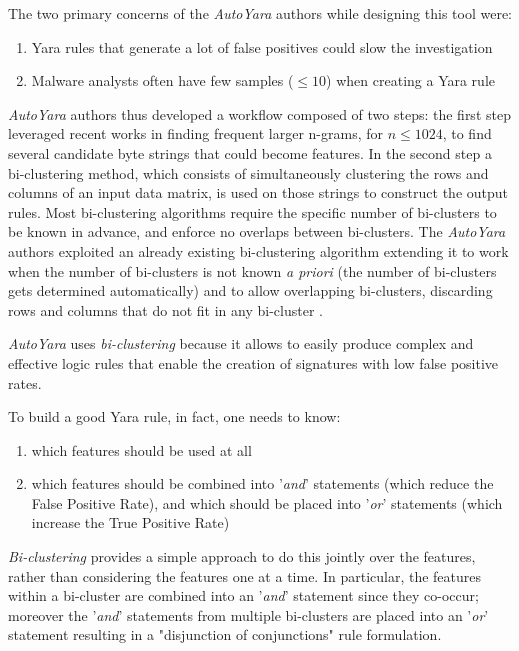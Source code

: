 \documentclass[pdfa%
,cucitura%
]{toptesi}
\begin{document}
The two primary concerns of the \textit{AutoYara} authors while designing this tool were:
\begin{enumerate}
	\item Yara rules that generate a lot of false positives could slow the investigation
	
	\item Malware analysts often have few samples ($\leq 10$) when creating a Yara rule
\end{enumerate}

\textit{AutoYara} authors thus developed a workflow composed of two steps: the first step leveraged recent works in finding frequent larger n-grams, for $n \leq 1024$, to find several candidate byte strings that could become features. In the second step a bi-clustering method, which consists of simultaneously clustering the rows and columns of an input data matrix, is used on those strings to construct the output rules. Most bi-clustering algorithms require the specific number of bi-clusters to be known in advance, and enforce no overlaps between bi-clusters. The \textit{AutoYara} authors exploited an already existing bi-clustering algorithm extending it to work when the number of bi-clusters is not known \textit{a priori} (the number of bi-clusters gets determined automatically) and to allow overlapping bi-clusters, discarding rows and columns that do not fit in any bi-cluster \cite{RaffAYRGUB}.

\textit{AutoYara} uses \textit{bi-clustering} because it allows to easily produce complex and effective logic rules that enable the creation of signatures with low false positive rates.

To build a good Yara rule, in fact, one needs to know:
\begin{enumerate}
	\item which features should be used at all
	
	\item which features should be combined into '\textit{and}' statements (which reduce the False Positive Rate), and which should be placed into '\textit{or}' statements (which increase the True Positive Rate)
\end{enumerate}
\textit{Bi-clustering} provides a simple approach to do this jointly over the features, rather than considering the features one at a time. In particular, the features within a bi-cluster are combined into an '\textit{and}' statement since they co-occur; moreover the '\textit{and}' statements from multiple bi-clusters are placed into an '\textit{or}' statement resulting in a "disjunction of conjunctions" rule formulation.
\end{document}
